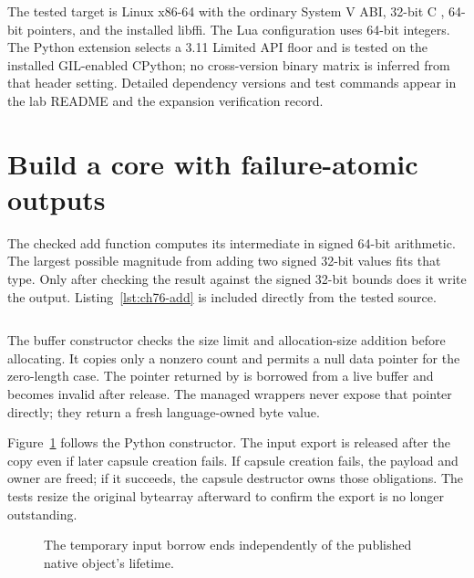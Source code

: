 The tested target is Linux x86-64 with the ordinary System V ABI, 32-bit C , 64-bit pointers, and the installed libffi.
The Lua configuration uses 64-bit integers.
The Python extension selects a 3.11 Limited API floor and is tested on the installed GIL-enabled CPython; no cross-version binary matrix is inferred from that header setting.
Detailed dependency versions and test commands appear in the lab README and the expansion verification record.

\section{Build a core with failure-atomic outputs}
\label{sec:ch76-core}
The checked add function computes its intermediate in signed 64-bit arithmetic.
The largest possible magnitude from adding two signed 32-bit values fits that type.
Only after checking the result against the signed 32-bit bounds does it write the output.
Listing~\ref{lst:ch76-add} is included directly from the tested source.

\begin{listing}[htbp]
\caption{The native core publishes an integer only after validating the result range.}
\label{lst:ch76-add}
\inputminted[firstline=8,lastline=16]{c}{example-code/ffi-labs/bookffi.c}
\end{listing}

The buffer constructor checks the size limit and allocation-size addition before allocating.
It copies only a nonzero count and permits a null data pointer for the zero-length case.
The pointer returned by  is borrowed from a live buffer and becomes invalid after release.
The managed wrappers never expose that pointer directly; they return a fresh language-owned byte value.

Figure~\ref{fig:ch76-buffer} follows the Python constructor.
The input export is released after the copy even if later capsule creation fails.
If capsule creation fails, the payload and owner are freed; if it succeeds, the capsule destructor owns those obligations.
The tests resize the original bytearray afterward to confirm the export is no longer outstanding.

\begin{figure}[htbp]
\centering
{}
\caption{The temporary input borrow ends independently of the published native object's lifetime.}
\label{fig:ch76-buffer}
\end{figure}

